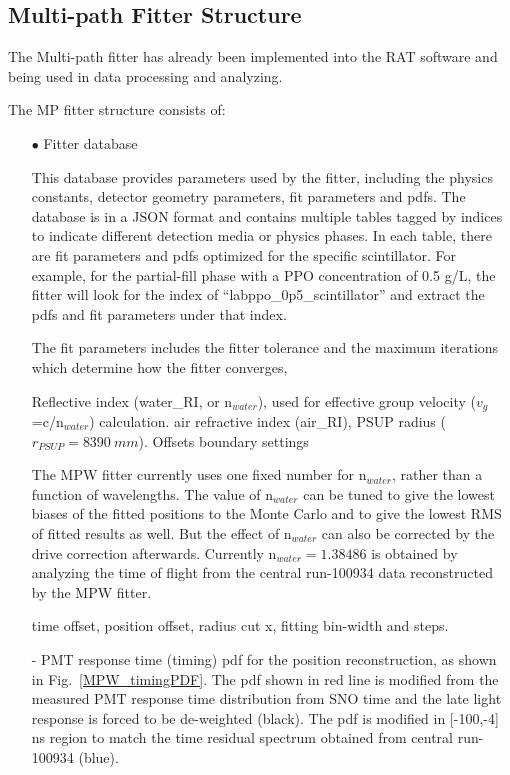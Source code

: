 \subsection{Multi-path Fitter Structure}
The Multi-path fitter has already been implemented into the RAT software and being used in data processing and analyzing.

The MP fitter structure consists of: 
\begin{itemize}
\item[$\bullet$] Fitter database

This database provides parameters used by the fitter, including the physics constants, detector geometry parameters, fit parameters and pdfs. The database is in a JSON format\cite{JSONwiki} and contains multiple tables tagged by indices to indicate different detection media or physics phases. In each table, there are fit parameters and pdfs optimized for the specific scintillator. For example, for the partial-fill phase with a PPO concentration of 0.5 g/L, the fitter will look for the index of ``labppo\_0p5\_scintillator'' and extract the pdfs and fit parameters under that index.  

The fit parameters includes the fitter tolerance and the maximum iterations which determine how the fitter converges, 

Reflective index (water\_RI, or n$_{water}$), used for effective group velocity ($v_g$ =c/n$_{water}$) calculation. 
air refractive index (air\_RI), PSUP radius ($r_{PSUP}=8390~mm$). Offsets
boundary settings


The MPW fitter currently uses one fixed number for n$_{water}$, rather than a function of wavelengths. The value of n$_{water}$ can be tuned to give the lowest biases of the fitted positions to the Monte Carlo and to give the lowest RMS of fitted results as well. But the effect of n$_{water}$ can also be corrected by the drive correction afterwards. Currently n$_{water}=1.38486$ is obtained by analyzing the time of flight from the  central run-100934 data reconstructed by the MPW fitter. 

time offset, position offset, radius cut x, fitting bin-width and steps.


- PMT response time (timing) pdf for the position reconstruction, as shown in Fig.~\ref{MPW_timingPDF}. The pdf shown in red line is modified from the measured PMT response time distribution from SNO time and the late light response is forced to be de-weighted (black). The pdf is modified in [-100,-4] ns region to match the time residual spectrum obtained from  central run-100934 (blue).


\end{itemize}
